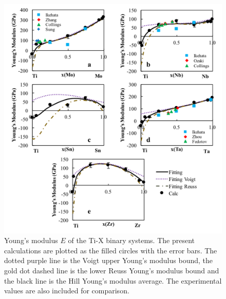 \pagebreak
\begin{figure}[H]
	\centering
	\includegraphics[width=\textwidth]{Chapter-5/Figures/tixyoungs.png}
	\caption{Young's modulus $E$ of the Ti-X binary systems. The present calculations are plotted as the filled circles with the error bars. The dotted purple line is the Voigt upper Young's modulus bound, the gold dot dashed line is the lower Reuss Young's modulus bound and the black line is the Hill Young's modulus average. The experimental values \cite{Ikehata2004,Zhang2015,Boyer1994,Sung2015,Ozaki2004,Fedotov1985,Zhou2009a,Zhou2004a,Friak2012,Wu2010a} are also included for comparison. }
	\label{Ch5-figure:tixyoungs}
\end{figure}


